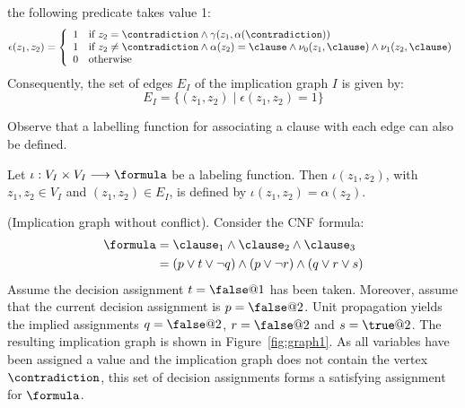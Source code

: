 \begin{definition}
    the following predicate takes value 1:
    \begin{equation}
        \epsilon(z_1, z_2) = 
        \left\{
            \begin{array}{ll}
                1 & \text{if $z_2 = \contradiction \land \gamma(z_1, \alpha(\contradiction))$}\\
                1 & \text{if $z_2 \neq \contradiction \land \alpha(z_2) = \clause \land \nu_0(z_1, \clause) \land \nu_1(z_2, \clause)$}\\
                0 & \text{otherwise}
            \end{array}
        \right.
    \end{equation}
    Consequently, the set of edges $E_I$ of the implication graph $I$ is given by:
    \begin{equation}
        E_I = \{ (z_1, z_2) \mid \epsilon(z_1, z_2) = 1\}
    \end{equation}
\end{definition}

Observe that a labelling function for associating a clause with each edge can
also be defined. 

\begin{definition}
    Let $\iota : V_I \times V_I \longrightarrow \formula$ be a labeling
    function. Then $\iota(z_1, z_2)$, with $z_1, z_2 \in V_I$ and $(z_1, z_2)
    \in E_I$, is defined by $\iota(z_1, z_2) = \alpha(z_2)$.
\end{definition}

\begin{example}%
    \label{ex:graph1}
    (Implication graph without conflict). Consider the CNF formula:
    \begin{align*}
        \formula & = \clause_1 \land \clause_2 \land \clause_3\\
                 & = (p \lor t \lor \neg q) \land (p \lor \neg r) \land (q \lor r \lor s)
    \end{align*}
    Assume the decision assignment $t = \false @1$ has been taken. Moreover,
    assume that the current decision assignment is $p = \false @2$. Unit
    propagation yields the implied assignments $q = \false @2$, $r = \false @2$
    and $s = \true @2$. The resulting implication graph is shown in
    Figure~\ref{fig:graph1}. As all variables have been assigned a value and the
    implication graph does not contain the vertex $\contradiction$, this set of decision
    assignments forms a satisfying assignment for $\formula$.
    
\end{example}

